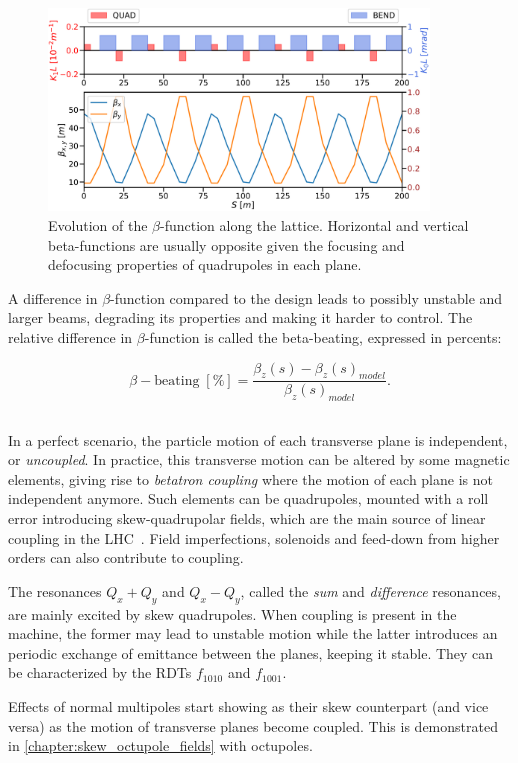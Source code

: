 \begin{figure}[H]
    \centering
    \includegraphics[width=0.9\textwidth]{images/beta_function.pdf}
    \caption{Evolution of the $\beta$-function along the lattice. Horizontal and vertical beta-functions
    are usually opposite given the focusing and defocusing properties of quadrupoles in each plane.}
    \label{fig:beam_optics:beta}
\end{figure}

A difference in $\beta$-function compared to the design leads to possibly unstable and larger beams,
degrading its properties and making it harder to control. The relative difference in
$\beta$-function is called the beta-beating, expressed in percents: 

\begin{equation}
    \beta-\mathrm{beating \; [\%]}  = \frac{\beta_z(s) - \beta_z(s)_{model}}{\beta_z(s)_{model}}.
    \label{eq:beam_optics:beating}
\end{equation}


\subsection{}

In a perfect scenario, the particle motion of each transverse plane is independent, or
\textit{uncoupled}. In practice, this transverse motion can be altered by some magnetic elements,
giving rise to \textit{betatron coupling} where the motion of each plane is not independent anymore.
Such elements can be quadrupoles, mounted with a roll error introducing skew-quadrupolar fields,
which are the main source of linear coupling in the LHC~\cite{felix_soubelet_local_2023}. Field
imperfections, solenoids and feed-down from higher orders can also contribute to coupling.

The resonances $Q_x + Q_y$ and $Q_x - Q_y$, called the \textit{sum} and \textit{difference}
resonances, are mainly excited by skew quadrupoles. When coupling is present in the
machine, the former may lead to unstable motion while the latter introduces an periodic exchange of
emittance between the planes, keeping it stable. They can be characterized by the RDTs $f_{1010}$
and $f_{1001}$.

Effects of normal multipoles start showing as their skew counterpart (and vice versa) as the motion
of transverse planes become coupled. This is demonstrated in \cref{chapter:skew_octupole_fields}
with octupoles.

